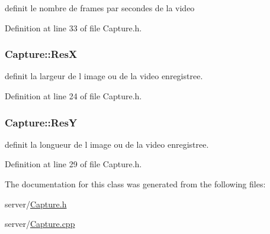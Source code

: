 definit le nombre de frames par secondes de la video 



Definition at line 33 of file Capture.\+h.

\subsubsection[{\texorpdfstring{ResX}{ResX}}]{\setlength{\rightskip}{0pt plus 5cm}Capture\+::\+ResX\hspace{0.3cm}{\ttfamily [private]}}\hypertarget{classCapture_aa210af994a7df17b80392adc91103b7f}{}\label{classCapture_aa210af994a7df17b80392adc91103b7f}


definit la largeur de l image ou de la video enregistree. 



Definition at line 24 of file Capture.\+h.

\subsubsection[{\texorpdfstring{ResY}{ResY}}]{\setlength{\rightskip}{0pt plus 5cm}Capture\+::\+ResY\hspace{0.3cm}{\ttfamily [private]}}\hypertarget{classCapture_a5075c034c091f4c0ab84ddc10b56cd6c}{}\label{classCapture_a5075c034c091f4c0ab84ddc10b56cd6c}


definit la longueur de l image ou de la video enregistree. 



Definition at line 29 of file Capture.\+h.



The documentation for this class was generated from the following files\+:\begin{DoxyCompactItemize}
\item 
server/\hyperlink{Capture_8h}{Capture.\+h}\item 
server/\hyperlink{Capture_8cpp}{Capture.\+cpp}\end{DoxyCompactItemize}
